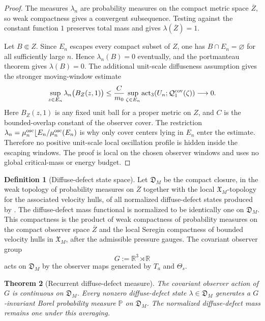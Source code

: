 \documentclass[11pt]{amsart}
\numberwithin{equation}{section}
\theoremstyle{plain}
\newtheorem{theorem}{Theorem}[section]
\theoremstyle{definition}
\newtheorem{definition}[theorem]{Definition}
\theoremstyle{remark}
\newcommand{\actthree}{\operatorname{act}_3}
\begin{document}
\begin{proof}
The measures \(\lambda_n\) are probability measures on the compact metric space
\(\overline Z\), so weak compactness gives a convergent subsequence.  Testing
against the constant function \(1\) preserves total mass and gives
\(\lambda(\overline Z)=1\).

Let \(B\Subset Z\).  Since \(E_n\) escapes every compact subset of \(Z\), one
has \(B\cap E_n=\varnothing\) for all sufficiently large \(n\).  Hence
\(\lambda_n(B)=0\) eventually, and the portmanteau theorem gives
\(\lambda(B)=0\).  The additional unit-scale diffuseness assumption gives the
stronger moving-window estimate
\[
   \sup_{z\in E_n}
      \lambda_n\bigl(B_Z(z,1)\bigr)
   \le
   \frac{C}{m_0}
   \sup_{\zeta\in E_n}
      \actthree(U_n;\mathcal Q_1^{\rm cov}(\zeta))
   \longrightarrow0 .
\]
Here \(B_Z(z,1)\) is any fixed unit ball for a proper metric on \(Z\),
and \(C\) is the bounded-overlap constant of the observer cover.  The
restriction \(\lambda_n=\mu_n^{\rm osc}\lfloor E_n/\mu_n^{\rm osc}(E_n)\) is
why only cover centers lying in \(E_n\) enter the estimate.
Therefore no positive unit-scale local oscillation profile is hidden inside the
escaping windows.  The proof is local on the chosen observer windows and uses no
global critical-mass or energy budget.
\end{proof}

\begin{definition}[Diffuse-defect state space]
\label{def:diffuse-defect-state-space}
Let \(\mathfrak D_M\) be the compact closure, in the weak topology of
probability measures on \(\overline Z\) together with the local
\(\mathfrak X_M\)-topology for the associated velocity hulls, of all normalized
diffuse-defect states produced by .  The
diffuse-defect mass functional is normalized to be identically one on
\(\mathfrak D_M\).  This compactness is the product of weak compactness of
probability measures on the compact observer space \(\overline Z\) and the
local Seregin compactness of bounded velocity hulls in \(\mathfrak X_M\), after
the admissible pressure gauges.  The covariant observer group
\[
   G:=\mathbb R^3\rtimes\mathbb R
\]
acts on \(\mathfrak D_M\) by the observer maps generated by \(T_a\) and
\(\Theta_s\).
\end{definition}

\begin{theorem}[Recurrent diffuse-defect measure]
\label{thm:recurrent-diffuse-defect-measure}
The covariant observer action of \(G\) is continuous on \(\mathfrak D_M\).
Every nonzero diffuse-defect state
\(\lambda\in\mathfrak D_M\) generates a \(G\)-invariant Borel probability
measure \(\mathbb P\) on \(\mathfrak D_M\).  The normalized diffuse-defect mass
remains one under this averaging.
\end{theorem}
\end{document}
